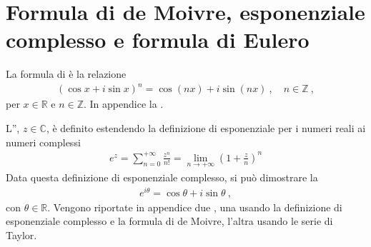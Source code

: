 \documentclass[letterpaper,10pt,italian]{jupyterBook}
\begin{document}
\section{Formula di de Moivre, esponenziale complesso e formula di Eulero}
\label{\detokenize{ch/algebra/complex-algebra:formula-di-de-moivre-esponenziale-complesso-e-formula-di-eulero}}\label{\detokenize{ch/algebra/complex-algebra:math-hs-algebra-complex-demoivre-euler}}
\sphinxAtStartPar
La formula di  è la relazione
\begin{equation}\label{equation:ch/algebra/complex-algebra:complex:demoivre}
\begin{split}(\cos x + i \sin x)^n = \cos(nx) + i \sin(nx) \ , \quad n \in \mathbb{Z} \ ,\end{split}
\end{equation}
\sphinxAtStartPar
per \(x \in \mathbb{R}\) e \(n \in \mathbb{Z}\). In appendice la {\hyperref[\detokenize{ch/algebra/complex-algebra-notes:math-hs-algebra-complex-notes-demoivre}]{}}.

\sphinxAtStartPar
L”, \(z \in \mathbb{C}\), è definito estendendo la definizione di esponenziale per i numeri reali ai numeri complessi
\begin{equation}\label{equation:ch/algebra/complex-algebra:complex:complex-exp}
\begin{split}e^z = \sum_{n = 0}^{+\infty} \frac{z^n}{n!} = \lim_{n \rightarrow +\infty} \left( 1 + \frac{z}{n} \right)^n\end{split}
\end{equation}
\sphinxAtStartPar
Data questa definizione di esponenziale complesso, si può dimostrare la 
\begin{equation}\label{equation:ch/algebra/complex-algebra:complex:euler}
\begin{split}e^{i \theta} = \cos \theta + i \sin \theta \ ,\end{split}
\end{equation}
\sphinxAtStartPar
con \(\theta \in \mathbb{R}\). Vengono riportate in appendice due {\hyperref[\detokenize{ch/algebra/complex-algebra-notes:math-hs-algebra-complex-notes-euler}]{}}, una usando la definizione di esponenziale complesso e la formula di de Moivre, l’altra usando le serie di Taylor.
\end{document}
